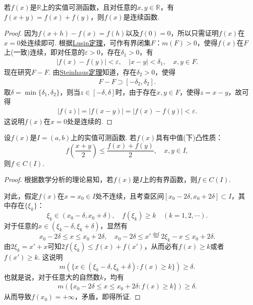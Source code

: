 \documentclass[../../main.tex]{subfiles}%
\begin{document}
\begin{example}
若\(f(x)\)是\(\mathbb{R}\)上的实值可测函数，且对任意的\(x, y \in \mathbb{R}\)，有\(f(x + y) = f(x) + f(y)\)，则\(f(x)\)是连续函数.
\end{example}
\begin{proof}

因为\(f(x + h) - f(x) = f(h)\)以及\(f(0) = 0\)，所以只需证明\(f(x)\)在\(x = 0\)处连续即可. 根据\hyperref[theorem:Lusin(卢津)定理]{Lusin定理}，可作有界闭集\(F\)：\(m(F)>0\)，使得\(f(x)\)在\(F\)上(一致)连续，即对任意的\(\varepsilon > 0\)，存在\(\delta_1 > 0\)，有
\begin{align*}
|f(x) - f(y)| < \varepsilon, \quad |x - y| < \delta_1, \quad x, y \in F.
\end{align*}
现在研究\(F - F\). 由\hyperref[theorem:Steinhaus定理]{Steinhaus定理}知道，存在\(\delta_2 > 0\)，使得
\begin{align*}
F - F \supset [-\delta_2, \delta_2].
\end{align*}
取\(\delta = \min\{\delta_1, \delta_2\}\)，则当\(z \in [-\delta, \delta]\)时，由于存在\(x, y \in F\)，使得\(z = x - y\)，故可得
\begin{align*}
|f(z)| = |f(x - y)| = |f(x) - f(y)| < \varepsilon.
\end{align*}
这说明\(f(x)\)在\(x = 0\)处是连续的.

\end{proof}

\begin{example}
设\(f(x)\)是\(I = (a, b)\)上的实值可测函数. 若\(f(x)\)具有中值(下)凸性质：
\[f\left(\frac{x + y}{2}\right) \leqslant \frac{f(x) + f(y)}{2}, \quad x, y \in I,\]
则\(f \in C(I)\).
\end{example}
\begin{proof}

根据数学分析的理论易知，若\(f(x)\)是\(I\)上的有界函数，则\(f \in C(I)\).

对此，假定\(f(x)\)在\(x = x_0 \in I\)处不连续，且考查区间\([x_0 - 2\delta, x_0 + 2\delta] \subset I\)，其中存在\(\{\xi_k\}\)：
\[\xi_k \in (x_0 - \delta, x_0 + \delta), \quad f(\xi_k) \geqslant k \quad (k = 1,2,\cdots).\]
对于任意的\(x \in (\xi_k - \delta, \xi_k + \delta)\)，显然有
\[x_0 - 2\delta \leqslant x \leqslant x_0 + 2\delta, \quad x_0 - 2\delta \leqslant x' \stackrel{\text{def}}{=} 2\xi_k - x \leqslant x_0 + 2\delta.\]
由\(2\xi_k = x' + x\)可知\(2f(\xi_k) \leqslant f(x) + f(x')\)，从而必有\(f(x) \geqslant k\)或者\(f(x') \geqslant k\).
这说明
\[m(\{x \in (\xi_k - \delta, \xi_k + \delta) : f(x) \geqslant k\}) \geqslant \delta.\]
也就是说，对于任意大的自然数\(k\)，均有
\begin{align*}
m(\{x_0 - 2\delta \leqslant x \leqslant x_0 + 2\delta : f(x) \geqslant k\}) \geqslant \delta.
\end{align*}
从而导致\(f(x_0) = +\infty\)，矛盾，即得所证. 

\end{proof}
\end{document}
